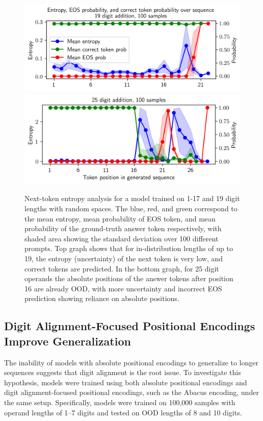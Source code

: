 \begin{figure}[h!]
    \centering
    \includegraphics[width=\textwidth]{fig/next_token_entropy_19.png}
    \includegraphics[width=\textwidth]{fig/next_token_entropy_25.png}
    \caption{Next-token entropy analysis for a model trained on 1-17 and 19 digit lengths with random spaces. The blue, red, and green correspond to the mean entropy, mean probability of EOS token, and mean probability of the ground-truth answer token respectively, with shaded area showing the standard deviation over 100 different prompts. Top graph shows that for in-distribution lengths of up to 19, the entropy (uncertainty) of the next token is very low, and correct tokens are predicted. In the bottom graph, for 25 digit operands the absolute positions of the answer tokens after position 16 are already OOD, with more uncertainty and incorrect EOS prediction showing reliance on absolute positions.}
    \label{fig:next_token_entropy}
\end{figure}

\subsection{Digit Alignment-Focused Positional Encodings Improve Generalization}\label{subsec:digit_alignment_pe}

The inability of models with absolute positional encodings to generalize to longer sequences suggests that digit alignment is the root issue. To investigate this hypothesis, models were trained using both absolute positional encodings and digit alignment-focused positional encodings, such as the Abacus encoding, under the same setup. Specifically, models were trained on 100,000 samples with operand lengths of 1--7 digits and tested on OOD lengths of 8 and 10 digits.

